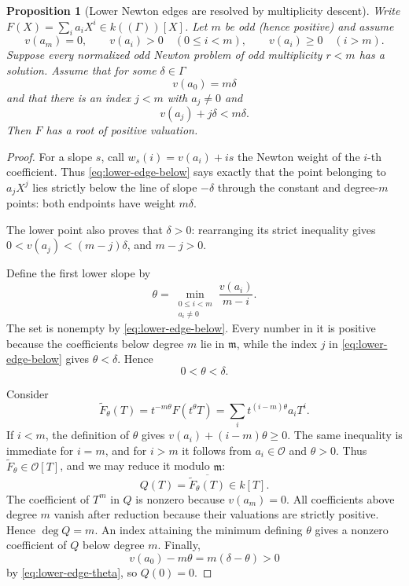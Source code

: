 \documentclass[11pt]{article}
\newcommand{\Val}{v}
\newcommand{\Ocal}{\mathcal O}
\theoremstyle{proofnote}
\newtheorem{proposition}[theorem]{Proposition}
\begin{document}
\begin{proposition}[Lower Newton edges are resolved by multiplicity descent]
\label{prop:lower-edge}
  Write \(F(X)=\sum_i a_iX^i\in k((\Gamma))[X]\).  Let \(m\) be odd (hence
  positive) and assume
  \[
    \Val(a_m)=0,\qquad
    \Val(a_i)>0\quad(0\le i<m),\qquad
    \Val(a_i)\ge0\quad(i>m).
  \]
  Suppose every normalized odd Newton problem of odd multiplicity \(r<m\)
  has a solution.  Assume that for some \(\delta\in\Gamma\)
  \[
    \Val(a_0)=m\delta
  \]
  and that there is an index \(j<m\) with \(a_j\ne0\) and
  \[
    \Val(a_j)+j\delta<m\delta.
    \tag{LE}\label{eq:lower-edge-below}
  \]
  Then \(F\) has a root of positive valuation.
\end{proposition}
\begin{proof}
  For a slope \(s\), call
  \(w_s(i)=\Val(a_i)+is\) the Newton weight of the \(i\)-th coefficient.
  Thus \eqref{eq:lower-edge-below} says exactly that the point belonging to
  \(a_jX^j\) lies strictly below the line of slope \(-\delta\) through the
  constant and degree-\(m\) points: both endpoints have weight \(m\delta\).

  The lower point also proves that \(\delta>0\): rearranging its strict
  inequality gives
  \(0<\Val(a_j)<(m-j)\delta\), and \(m-j>0\).

  Define the first lower slope by
  \[
    \theta=
    \min_{\substack{0\le i<m\\a_i\ne0}}
       \frac{\Val(a_i)}{m-i}.
  \]
  The set is nonempty by \eqref{eq:lower-edge-below}.  Every number in it is
  positive because the coefficients below degree \(m\) lie in
  \(\mathfrak m\), while the index \(j\) in \eqref{eq:lower-edge-below}
  gives \(\theta<\delta\).  Hence
  \[
    0<\theta<\delta.
    \tag{S}\label{eq:lower-edge-theta}
  \]

  Consider
  \[
    \widetilde F_\theta(T)=t^{-m\theta}F(t^\theta T)
      =\sum_i t^{(i-m)\theta}a_iT^i.
  \]
  If \(i<m\), the definition of \(\theta\) gives
  \(\Val(a_i)+(i-m)\theta\ge0\).  The same inequality is immediate for
  \(i=m\), and for \(i>m\) it follows from \(a_i\in\Ocal\) and
  \(\theta>0\).  Thus \(\widetilde F_\theta\in\Ocal[T]\), and we may reduce
  it modulo \(\mathfrak m\):
  \[
    Q(T)=\overline{\widetilde F_\theta(T)}\in k[T].
  \]
  The coefficient of \(T^m\) in \(Q\) is nonzero because
  \(\Val(a_m)=0\).  All coefficients above degree \(m\) vanish after
  reduction because their valuations are strictly positive.  Hence
  \(\deg Q=m\).  An index attaining the minimum defining \(\theta\) gives a
  nonzero coefficient of \(Q\) below degree \(m\).  Finally,
  \[
    \Val(a_0)-m\theta=m(\delta-\theta)>0
  \]
  by \eqref{eq:lower-edge-theta}, so \(Q(0)=0\).


\end{proof}
\end{document}

